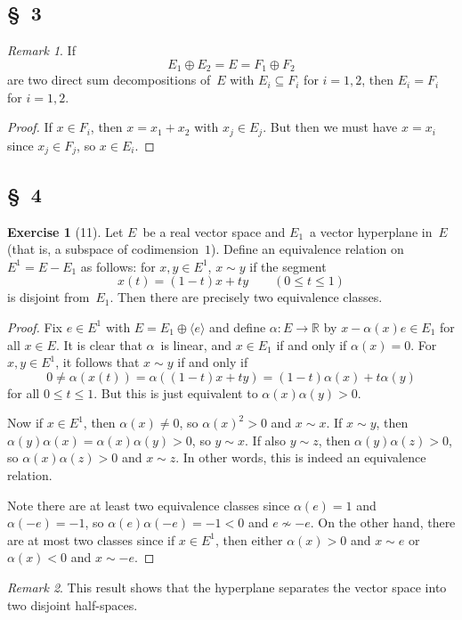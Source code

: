 \documentclass[letterpaper,12pt]{article}
\newcommand{\R}{\mathbb{R}}
\renewcommand{\equiv}{\sim}
\newcommand{\dsum}{\oplus}
\newcommand{\gen}[1]{\langle#1\rangle}
\theoremstyle{definition}
\newtheorem*{exer}{Exercise}
\theoremstyle{remark}
\newtheorem*{rmk}{Remark}
\begin{document}
\subsection*{\S~3}
\begin{rmk}
If
\[E_1\dsum E_2=E=F_1\dsum F_2\]
are two direct sum decompositions of~\(E\) with \(E_i\subseteq F_i\) for \(i=1,2\), then \(E_i=F_i\) for \(i=1,2\).
\end{rmk}
\begin{proof}
If \(x\in F_i\), then \(x=x_1+x_2\) with \(x_j\in E_j\). But then we must have \(x=x_i\) since \(x_j\in F_j\), so \(x\in E_i\).
\end{proof}

\subsection*{\S~4}
\begin{exer}[11]
Let \(E\)~be a real vector space and \(E_1\)~a vector hyperplane in~\(E\) (that is, a subspace of codimension~\(1\)). Define an equivalence relation on \(E^1=E-E_1\) as follows: for \(x,y\in E^1\), \(x\equiv y\) if the segment
\[x(t)=(1-t)x+ty\qquad(0\le t\le 1)\]
is disjoint from~\(E_1\). Then there are precisely two equivalence classes.
\end{exer}
\begin{proof}
Fix \(e\in E^1\) with \(E=E_1\dsum\gen{e}\) and define \(\alpha:E\to\R\) by \(x-\alpha(x)e\in E_1\) for all \(x\in E\). It is clear that \(\alpha\)~is linear, and \(x\in E_1\) if and only if \(\alpha(x)=0\). For \(x,y\in E^1\), it follows that \(x\equiv y\) if and only if
\[0\ne\alpha(x(t))=\alpha((1-t)x+ty)=(1-t)\alpha(x)+t\alpha(y)\]
for all \(0\le t\le 1\). But this is just equivalent to \(\alpha(x)\alpha(y)>0\).

Now if \(x\in E^1\), then \(\alpha(x)\ne0\), so \(\alpha(x)^2>0\) and \(x\equiv x\). If \(x\equiv y\), then \(\alpha(y)\alpha(x)=\alpha(x)\alpha(y)>0\), so \(y\equiv x\). If also \(y\equiv z\), then \(\alpha(y)\alpha(z)>0\), so \(\alpha(x)\alpha(z)>0\) and \(x\equiv z\). In other words, this is indeed an equivalence relation.

Note there are at least two equivalence classes since \(\alpha(e)=1\) and \(\alpha(-e)=-1\), so \(\alpha(e)\alpha(-e)=-1<0\) and \(e\not\equiv -e\). On the other hand, there are at most two classes since if \(x\in E^1\), then either \(\alpha(x)>0\) and \(x\equiv e\) or \(\alpha(x)<0\) and \(x\equiv -e\).
\end{proof}
\begin{rmk}
This result shows that the hyperplane separates the vector space into two disjoint half-spaces.
\end{rmk}
\end{document}
